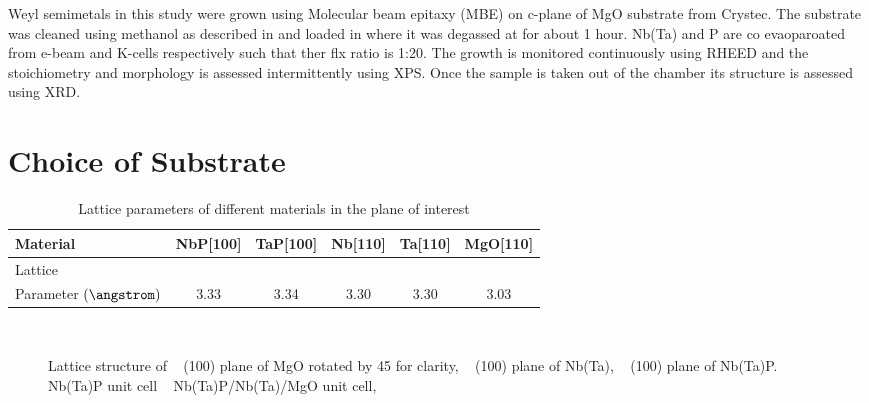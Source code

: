 \label{growth_of_wsm}

Weyl semimetals in this study were  grown using Molecular beam epitaxy (MBE) on c-plane 
of MgO substrate from Crystec. The substrate was cleaned using methanol
as described in  and loaded in \tamarind where it was degassed 
at  for about 1 hour. Nb(Ta) and P are co evaoparoated 
from e-beam and K-cells respectively such that ther flx ratio is 1:20. The growth is 
monitored continuously using RHEED and the stoichiometry and morphology is assessed 
intermittently using XPS. Once the sample is taken out of the chamber its structure is 
assessed using XRD.

\section{Choice of Substrate}

\begin{table}
    \caption {
            Lattice parameters of different materials in the plane of interest
        }
    \centering
    \begin{tabular}{lccccc}
        \toprule
        Material & NbP[100] & TaP[100] & Nb[110] & Ta[110] & MgO[110]\\
        \midrule
        Lattice \\Parameter $\left(\angstrom\right)$ & 3.33 & 3.34 & 3.30 & 3.30 & 3.03\\
        \bottomrule
    \end{tabular}
\end{table}


\begin{figure}
   
    \centering
    \\
    \caption{
        Lattice structure of
        \sfA~ (100) plane of MgO rotated by 45 \degree for clarity, 
        \sfB~  (100) plane of Nb(Ta),  
        \sfC~  (100) plane of Nb(Ta)P.
        \sfD~ Nb(Ta)P unit cell
        \sfE~ Nb(Ta)P/Nb(Ta)/MgO unit cell,
    }
\end{figure}


